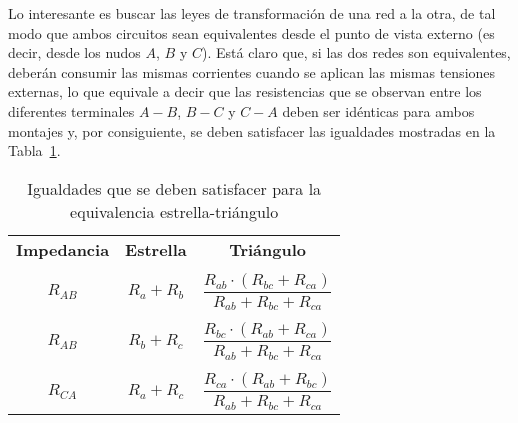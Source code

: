 \documentclass[11pt]{book} %
\numberwithin{dummy}{section}
\theoremstyle{ocrenumbox}
\theoremstyle{blacknumex}
\theoremstyle{blacknumbox}
\theoremstyle{ocrenum}
\begin{document}
	Lo interesante es buscar las leyes de transformación de una red a la otra, de tal modo que ambos circuitos sean equivalentes desde el punto de vista externo (es decir,
	desde los nudos $A$, $B$ y $C$). Está claro que, si las dos redes son equivalentes, deberán consumir las mismas
	corrientes cuando se aplican las mismas tensiones externas, lo que equivale a decir que las resistencias que se observan entre los diferentes terminales $A-B$, $B-C$ y $C-A$ deben ser idénticas para ambos montajes y, por consiguiente, se
	deben satisfacer las igualdades mostradas en la Tabla~\ref{tab.igualdades_estrellatriangulo}. 
	\begin{table}[htbp]
		\centering
		\begin{tabular}{c|c|c}
			\rowcolor{ocre!50} \textbf{Impedancia} & \textbf{Estrella} & \textbf{Triángulo}\\
			&&        \\[-0.75em]
			$R_{AB}$ & $R_a+R_b$ & $\dfrac{R_{ab} \cdot (R_{bc} + R_{ca})}{R_{ab} + R_{bc} + R_{ca}}$\\
			&&         \\[-0.75em]
			$R_{AB}$ & $R_b+R_c$ & $\dfrac{R_{bc} \cdot (R_{ab} + R_{ca})}{R_{ab} + R_{bc} + R_{ca}}$\\
			&& \\[-0.75em]
			$R_{CA}$ & $R_a+R_c$ & $\dfrac{R_{ca} \cdot (R_{ab} + R_{bc})}{R_{ab} + R_{bc} + R_{ca}}$\\
		\end{tabular}
		\caption{Igualdades que se deben satisfacer para la equivalencia estrella-triángulo}
		\label{tab.igualdades_estrellatriangulo}
	\end{table}
	
\end{document}

